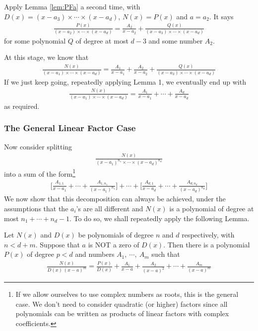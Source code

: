 Apply Lemma \ref{lem:PFa} a second time, with $D(x)=(x-a_3)\times\cdots\times (x-a_d)$,
$N(x)=P(x)$ and $a=a_2$. It says
\begin{align*}
\frac{P(x)}{(x-a_2)\times\cdots\times (x-a_d)}
=\frac{A_2}{x-a_2}+\frac{Q(x)}{(x-a_3)\times\cdots\times (x-a_d)}
\end{align*}
for some polynomial $Q$ of degree at most $d-3$ and some number $A_2$.

At this stage, we know that
\begin{align*}
\frac{N(x)}{(x-a_1)\times\cdots\times (x-a_d)}
=\frac{A_1}{x-a_1}+\frac{A_2}{x-a_2}+
\frac{Q(x)}{(x-a_3)\times\cdots\times (x-a_d)}
\end{align*}
If we just keep going, repeatedly applying Lemma 1, we eventually end up
with
\begin{align*}
\frac{N(x)}{(x-a_1)\times\cdots\times (x-a_d)}
=\frac{A_1}{x-a_1}+\cdots+\frac{A_d}{x-a_d}
\end{align*}
as required.

\subsubsection*{The General Linear Factor Case}
Now consider splitting
\begin{align*}
\frac{N(x)}{(x-a_1)^{n_1}\times\cdots\times (x-a_d)^{n_d}}
\end{align*}
into a sum of the form\footnote{If we allow ourselves to use complex numbers as roots,
this is the general case. We don't need to consider quadratic (or higher) factors since
all polynomials can be written as products of linear factors with complex coefficients.}
\begin{align*}
\Big[\frac{A_{1,1}}{x-a_1}+\cdots+\frac{A_{1,n_1}}{(x-a_1)^{n_1}}\Big]+\cdots+
\Big[\frac{A_{d,1}}{x-a_d}+\cdots+\frac{A_{d,n_d}}{(x-a_d)^{n_d}}\Big]
\end{align*}
We now show that this decomposition can always be achieved, under the
assumptions that the $a_i$'s are all different and  $N(x)$ is a polynomial
of degree at most $n_1+\cdots+n_d-1$. To do so, we shall repeatedly apply
the following Lemma.

\begin{lemma}\label{lem:PFb}
Let $N(x)$ and $D(x)$ be polynomials of degree $n$ and $d$ respectively,
with $n< d+m$. Suppose that $a$ is NOT a zero of $D(x)$. Then there
is a polynomial $P(x)$ of degree $p<d$ and numbers $A_1,\ \cdots,\ A_m$ such
that
\begin{align*}
\frac{N(x)}{D(x)\,(x-a)^m}
=\frac{P(x)}{D(x)}+\frac{A_1}{x-a}+\frac{A_2}{(x-a)^2}+\cdots
+\frac{A_m}{(x-a)^m}
\end{align*}
\end{lemma}



